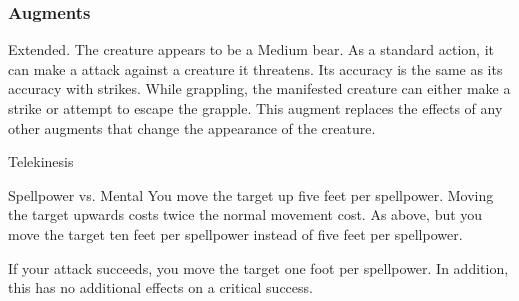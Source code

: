 \subsubsection{Augments}
 Extended.
The creature appears to be a Medium bear.
As a standard action, it can make a  attack against a creature it threatens.
Its accuracy is the same as its accuracy with strikes.
While grappling, the manifested creature can either make a strike or attempt to escape the grapple.
This augment replaces the effects of any other augments that change the appearance of the creature.
\begin{spellsection}{Telekinesis}
\begin{spellcontent}
\begin{spelltargetinginfo}
\end{spelltargetinginfo}
\begin{spelleffects}
\begin{spellattack}{Spellpower vs. Mental}
\spellsuccess
You move the target up five feet per spellpower. Moving the target upwards costs twice the normal movement cost.
\spellcritical
As above, but you move the target ten feet per spellpower instead of five feet per spellpower.
\end{spellattack}
\end{spelleffects}
\end{spellcontent}
\begin{spellfooter}
\miscastexplode
\end{spellfooter}
\begin{spellcantrip}
If your attack succeeds, you move the target one foot per spellpower. In addition, this has no additional effects on a critical success.
\end{spellcantrip}
\end{spellsection}

